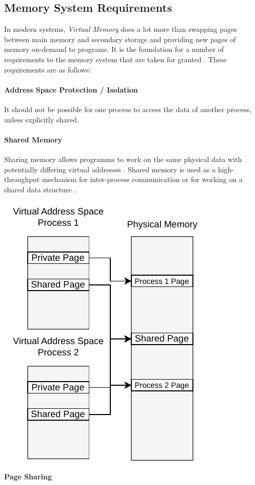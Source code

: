 \subsection{Memory System Requirements}
In modern systems, \textit{Virtual Memory} does a lot more than swapping pages between main memory and secondary
storage and providing new pages of memory on-demand to programs.
It is the foundation for a number of requirements to the memory system that are taken for granted
\cite{jacobSoftwaremanagedAddressTranslation1997}.
These requirements are as follows:


\paragraph{Address Space Protection / Isolation} It should not be possible for one process to access the data
of another process, unless explicitly shared.
\cite{jacobVirtualMemoryContemporary1998}


\paragraph{Shared Memory} Sharing memory allows programms to work on the same physical data with potentially
differing virtual addresses \cite{jacobVirtualMemoryContemporary1998}.
Shared memory is used as a high-throughput mechanism for inter-process communication or for working on
a shared data structure \cite{tanenbaumOS}.

\begin{marginfigure}
    \includegraphics*[width=1\marginparwidth]{figures/fund_share.pdf}
    \caption{\textbf{Page Sharing}}
\end{marginfigure}

